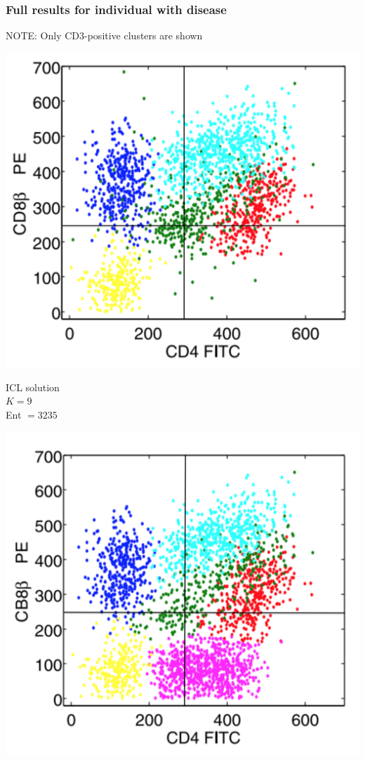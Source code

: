 \documentclass[mathserif,compress]{beamer}
\renewcommand\;{\,}
\begin{document}
\begin{frame}\frametitle{Full results for individual with disease}
\alert{NOTE}: Only CD3-positive clusters are shown
\begin{center}
\begin{minipage}{0.3\linewidth}
\includegraphics[width=\linewidth]{ICL_positive.png}
\begin{center}
ICL solution
\\$K = 9$
\\Ent $=3235$ 
\end{center}
\end{minipage}
\hfill
\begin{minipage}{0.3\linewidth}
\includegraphics[width=\linewidth]{BIC_positive.png}

\end{minipage}
\end{center}
\end{frame}
\end{document}
